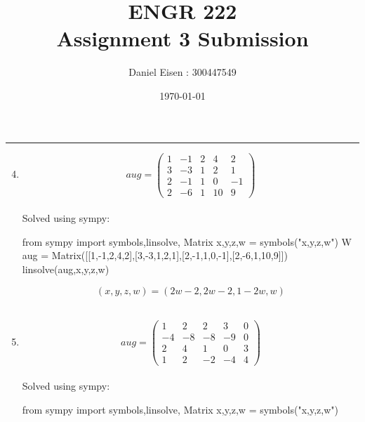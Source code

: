 \documentclass[11pt]{article}
\title{ENGR 222 \\ Assignment 3 Submission}
\author{Daniel Eisen : 300447549}
\date{\today}
\begin{document}
\begin{preview}

      \maketitle
      \hrule
      \begin{enumerate}
            \setcounter{enumi}{3}
            \item
                  $$aug       = \left( \begin{array}{cccc|c}1&-1&2&4&2\\ 3&-3&1&2&1\\ 2&-1&1&0&-1\\ 2&-6&1&10&9 \end{array}\right)$$ \\
                  Solved using sympy: \\
                  \begin{python}
                        from sympy import symbols,linsolve, Matrix
                        x,y,z,w = symbols("x,y,z,w")
W
                        aug = Matrix([[1,-1,2,4,2],[3,-3,1,2,1],[2,-1,1,0,-1],[2,-6,1,10,9]])
                        linsolve(aug,x,y,z,w)
                  \end{python}
                  $$(x,y,z,w)  = (2w-2,2w-2, 1-2w, w)$$ \\
            \item
                  $$aug       = \left( \begin{array}{cccc|c}1&2&2&3&0\\ -4&-8&-8&-9&0\\ 2&4&1&0&3\\ 1&2&-2&-4&4 \end{array}\right)$$ \\
                  Solved using sympy: \\
                  \begin{python}
                        from sympy import symbols,linsolve, Matrix
                        x,y,z,w = symbols("x,y,z,w")


\end{python}
\end{enumerate}
\end{preview}
\end{document}
